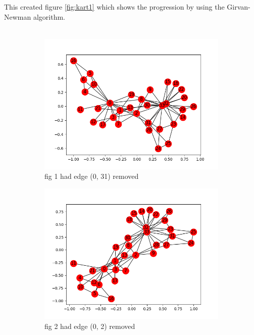 \documentclass[10pt,letterpaper]{article}
\begin{document}
This created figure \ref{fig:kart1} which shows the progression by using the Girvan-Newman algorithm.\\
\\
\begin{figure}[H]
  \centering
  \begin{subfigure}[b]{0.4\linewidth}
     \includegraphics[width=\linewidth]{karate01.png}
     \caption{fig 1 had edge (0, 31) removed}
  \end{subfigure}
  \begin{subfigure}[b]{0.4\linewidth}
     \includegraphics[width=\linewidth]{karate02.png} 
     \caption{fig 2 had edge (0, 2) removed}
  \end{subfigure}
  \begin{subfigure}[b]{0.4\linewidth}

\end{subfigure}
\end{figure}
\end{document}
